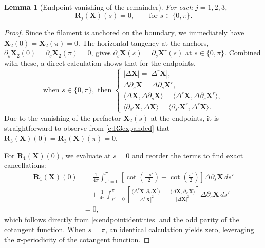 \documentclass{amsart}
\newtheorem{lemma}[theorem]{Lemma}
\begin{document}
\begin{lemma}[Endpoint vanishing of the remainder]\label{lem:endpoint_vanishing}
For each $j=1,2,3$,
\begin{equation} 
    \mathbf{R}_j(\mathbf{X})(s) = 0, \qquad \text{for } s \in \{ 0,\pi\}. 
\end{equation}
\end{lemma}

\begin{proof}
Since the filament is anchored on the boundary, we immediately have $\mathbf{X}_2(0) = \mathbf{X}_2(\pi) = 0$. The horizontal tangency at the anchors, $\partial_s\mathbf{X}_2(0) = \partial_s\mathbf{X}_2(\pi) = 0$, gives $\partial_s\mathbf{X}(s) = \partial_s\mathbf{X}^r(s)$ at $s\in\{0,\pi\}$.  Combined with these, a direct calculation shows that for the endpoints,
\begin{equation} \label{e:endpointidentities}
\text{when } s \in \{ 0 ,\pi\}, \text{ then }
\left\{ 
\begin{array}{l}
    |\Delta \mathbf{X}|  = |\Delta^r \mathbf{X}|, \\
    \Delta \partial_s \mathbf{X} = \Delta \partial_s \mathbf{X}^r, \\
    \langle \Delta \mathbf{X} , \Delta \partial_s \mathbf{X} \rangle  = \langle \Delta^r \mathbf{X}, \Delta \partial_s \mathbf{X}^r\rangle, \\
   \langle \partial_{s'} \mathbf{X} , \Delta\mathbf{X} \rangle  = \langle \partial_{s'} \mathbf{X}^r, \Delta^r \mathbf{X} \rangle.
\end{array}\right.  
\end{equation}
Due to the vanishing of the prefactor $\mathbf{X}_2(s)$ at the endpoints, it is straightforward to observe from \eqref{e:R3expanded} that $\mathbf{R}_3(\mathbf{X})(0) = \mathbf{R}_3(\mathbf{X})(\pi) = 0$.  

For $\mathbf{R}_1(\mathbf{X})(0)$, we evaluate at $s=0$ and reorder the terms to find exact cancellations:
\begin{align*}
    \mathbf{R}_1(\mathbf{X})(0) 
    & = \frac{1}{4\pi} 
    \int_{s'=0}^\pi \left[ \cot\left(\frac{-s'}{2}\right) + \cot\left(\frac{s'}{2}\right) \right] \Delta \partial_s  \mathbf{X}\, ds' \\
    & \quad + \frac{1}{4\pi} 
    \int_{s'=0}^\pi \left[ \frac{ \langle\Delta^r \mathbf{X}, \partial_{s'} \mathbf{X}^r \rangle }{ | \Delta^r \mathbf{X} |^2 } -   \frac{ \langle\Delta \mathbf{X}, \partial_{s'} \mathbf{X} \rangle }{ | \Delta \mathbf{X} |^2 } \right]\Delta \partial_s  \mathbf{X}\, ds' \\
    & = 0,
\end{align*}
which follows directly from \eqref{e:endpointidentities} and the odd parity of the cotangent function. When $s = \pi$, an identical calculation yields zero, leveraging the $\pi$-periodicity of the cotangent function. 


\end{proof}
\end{document}
